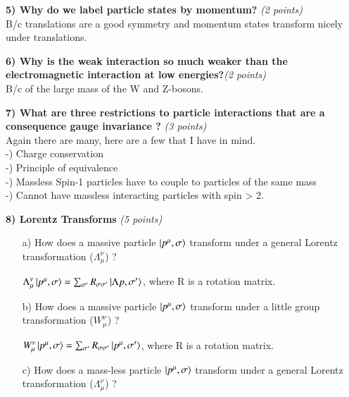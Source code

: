 {\vspace*{0.3in}

\textbf{5) Why do we label particle states by momentum? } \hfill \textit{(2 points)}\\

B/c translations are a good symmetry and momentum states transform nicely under translations.

\vspace*{0.3in}

\textbf{6) Why is the weak interaction so much weaker than the electromagnetic interaction at low energies?}\hfill \textit{(2 points)}\\

B/c of the large mass of the W and Z-bosons.

\vspace*{0.3in}


\textbf{7) What are three restrictions to particle interactions that are a consequence gauge invariance ? }\hfill \textit{(3 points)}\\

Again there are many, here are a few that I have in mind.\\
-) Charge conservation\\
-) Principle of equivalence\\
-) Massless Spin-1 particles have to couple to particles of the same mass\\
-) Cannot have massless interacting particles with spin > 2.

\vspace*{0.3in}

\textbf{8) Lorentz Transforms } \hfill \textit{(5 points)}\\
\begin{itemize}
\item[a)] How does a massive particle $\ket{p^\mu,\sigma}$ transform under a general Lorentz transformation ($\Lambda_\mu^\nu$)  ?

$\Lambda_\mu^\nu \ket{p^\mu,\sigma} = \sum_{\sigma'} R_{\sigma \sigma'} \ket{\Lambda p,\sigma'}$, where R is a rotation matrix.

\item[b)] How does a massive particle $\ket{p^\mu,\sigma}$ transform under a little group transformation ($W_\mu^\nu$)  ?

$W_\mu^\nu \ket{p^\mu,\sigma} = \sum_{\sigma'} R_{\sigma \sigma'} \ket{p^\mu,\sigma'}$, where R is a rotation matrix.

\item[c)] How does a mass-less particle $\ket{p^\mu,\sigma}$ transform under a general Lorentz transformation ($\Lambda_\mu^\nu$)  ?


\end{itemize}}
